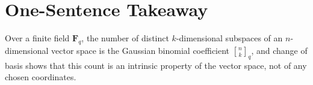 \documentclass[11pt]{article}
\theoremstyle{definition}
\theoremstyle{remark}
\newcommand{\F}{\mathbf{F}}
\newcommand{\qbinom}[2]{\genfrac{[}{]}{0pt}{}{#1}{#2}_q}
\begin{document}
	\section*{One-Sentence Takeaway}
	
	Over a finite field \(\F_q\), the number of distinct \(k\)-dimensional subspaces of an \(n\)-dimensional vector space is the Gaussian binomial coefficient \(\qbinom{n}{k}\), and change of basis shows that this count is an intrinsic property of the vector space, not of any chosen coordinates.
	
\end{document}
